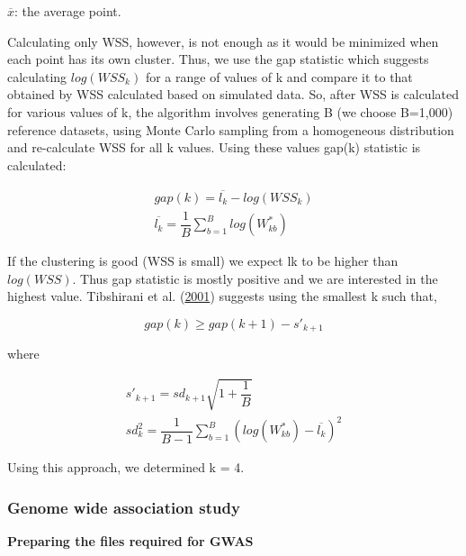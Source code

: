 \documentclass[12pt,twoside]{unicam}
\begin{document}
\(\overline{x}\): the average point.

Calculating only WSS, however, is not enough as it would be minimized when each point has its own cluster. Thus, we use the gap statistic which suggests calculating \(log(WSS_k)\) for a range of values of k and compare it to that obtained by WSS calculated based on simulated data. So, after WSS is calculated for various values of k, the algorithm involves generating B (we choose B=1,000) reference datasets, using Monte Carlo sampling from a homogeneous distribution and re-calculate WSS for all k values. Using these values gap(k) statistic is calculated:

\begin{equation}
\begin{aligned}
    gap(k) = \overline{l_k}-log(WSS_k)\\\overline{l_k} =\dfrac{1}{B}\sum_{b=1}^{B}{log(W^*_{kb})}
  \label{eq:disgapstat}
\end{aligned}
\end{equation}

If the clustering is good (WSS is small) we expect lk to be higher than \(log(WSS)\). Thus gap statistic is mostly positive and we are interested in the highest value. Tibshirani et al. (\protect\hyperlink{ref-Tibshirani2001}{2001}) suggests using the smallest k such that,

\begin{equation}
    gap(k)≥gap(k+1)-s'_{k+1}
  \label{eq:disgapstatincrem}
\end{equation}

where

\begin{equation}
\begin{aligned}
    s'_{k+1}=sd_{k+1}\sqrt{1+\dfrac{1}{B}}\\
    sd^2_k=\dfrac{1}{B-1}\sum_{b=1}^{B}{(log(W^*_{kb})-\overline{l_k})^2}
  \label{eq:dissk}
\end{aligned}
\end{equation}

Using this approach, we determined k = 4.

\hypertarget{genome-wide-association-study}{%
\subsubsection{Genome wide association study}\label{genome-wide-association-study}}

\textbf{Preparing the files required for GWAS}
\end{document}
